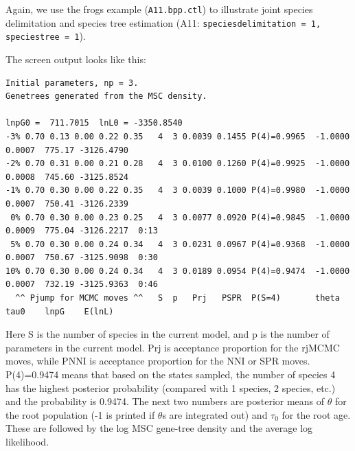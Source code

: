\documentclass{book}
\numberwithin{equation}{section} \renewcommand{\baselinestretch}{0.55}
\begin{document}
Again, we use the frogs example (\texttt{A11.bpp.ctl}) to illustrate
joint species delimitation and species tree estimation (A11:
\texttt{speciesdelimitation = 1, speciestree = 1}).

The screen output looks like this:

\begin{verbatim}
Initial parameters, np = 3.
Genetrees generated from the MSC density.

lnpG0 =  711.7015  lnL0 = -3350.8540
-3% 0.70 0.13 0.00 0.22 0.35   4  3 0.0039 0.1455 P(4)=0.9965  -1.0000 0.0007  775.17 -3126.4790
-2% 0.70 0.31 0.00 0.21 0.28   4  3 0.0100 0.1260 P(4)=0.9925  -1.0000 0.0008  745.60 -3125.8524
-1% 0.70 0.30 0.00 0.22 0.35   4  3 0.0039 0.1000 P(4)=0.9980  -1.0000 0.0007  750.41 -3126.2339
 0% 0.70 0.30 0.00 0.23 0.25   4  3 0.0077 0.0920 P(4)=0.9845  -1.0000 0.0009  775.04 -3126.2217  0:13
 5% 0.70 0.30 0.00 0.24 0.34   4  3 0.0231 0.0967 P(4)=0.9368  -1.0000 0.0007  750.67 -3125.9098  0:30
10% 0.70 0.30 0.00 0.24 0.34   4  3 0.0189 0.0954 P(4)=0.9474  -1.0000 0.0007  732.19 -3125.9363  0:46
  ^^ Pjump for MCMC moves ^^   S  p   Prj   PSPR  P(S=4)       theta   tau0    lnpG    E(lnL)
\end{verbatim}

Here S is the number of species in the current model, and p is the
number of parameters in the current model.  Prj is acceptance
proportion for the rjMCMC moves, while PNNI is acceptance proportion
for the NNI or SPR moves.  P(4)=0.9474 means that based on the states
sampled, the number of species 4 has the highest posterior probability
(compared with 1 species, 2 species, etc.) and the probability is
0.9474. The next two numbers are posterior means of $\theta$ for the
root population (-1 is printed if $\theta$s are integrated out) and
$\tau_0$ for the root age.  These are followed by the log MSC
gene-tree density and the average log likelihood.
\end{document}
